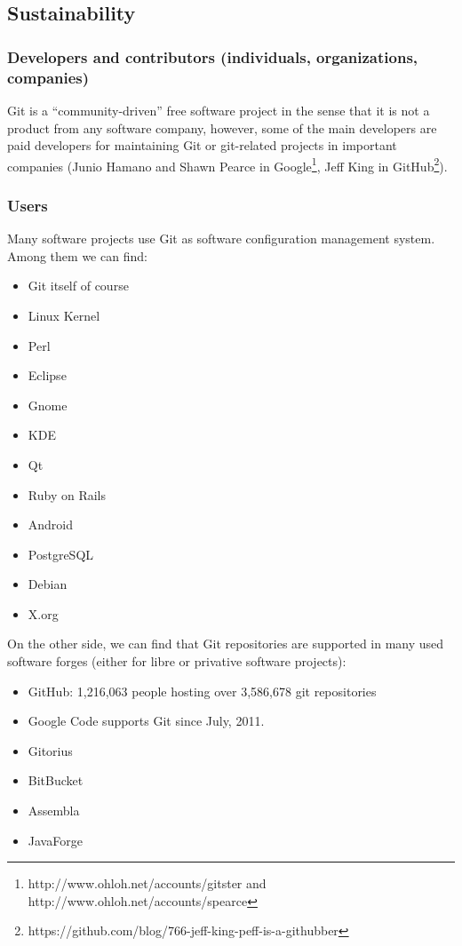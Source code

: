 \documentclass[a4paper,10pt]{article}
\begin{document}
\subsection{Sustainability}
\subsubsection{Developers and contributors (individuals, organizations,
companies)}
Git is a ``community-driven'' free software project in the sense that it is not
a product from any software company, however, some of the main developers are
paid developers for maintaining Git or git-related projects in important
companies (Junio Hamano and Shawn Pearce in
Google\footnote{http://www.ohloh.net/accounts/gitster and
http://www.ohloh.net/accounts/spearce}, Jeff King in
GitHub\footnote{https://github.com/blog/766-jeff-king-peff-is-a-githubber}).

\subsubsection{Users}
Many software projects use Git as software configuration management system.
Among them we can find\cite{Git}:
\begin{itemize}
 \item Git itself of course
 \item Linux Kernel
 \item Perl
 \item Eclipse
 \item Gnome
 \item KDE
 \item Qt
 \item Ruby on Rails
 \item Android
 \item PostgreSQL
 \item Debian
 \item X.org
\end{itemize}
On the other side, we can find that Git repositories are supported in many
used software forges (either for libre or privative software projects):
\begin{itemize}
 \item GitHub\cite{Github}: 1,216,063 people hosting over 3,586,678 git
repositories
 \item Google Code\cite{GoogleCode} supports Git since July, 2011.
 \item Gitorius
 \item BitBucket
 \item Assembla
 \item JavaForge
\end{itemize}
\end{document}
